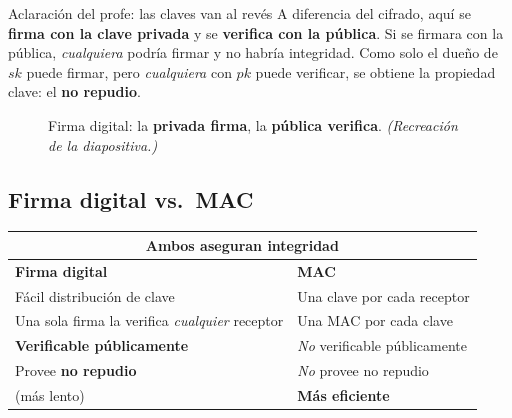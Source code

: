 \documentclass[11pt,a4paper]{article}
\newcommand{\Sign}{\mathrm{Sign}}
\newcommand{\Vrfy}{\mathrm{Vrfy}}
\begin{document}
\begin{defbox}{Aclaración del profe: las claves van al revés}
A diferencia del cifrado, aquí se \textbf{firma con la clave privada} y se \textbf{verifica con
la pública}. Si se firmara con la pública, \emph{cualquiera} podría firmar y no habría
integridad. Como solo el dueño de $sk$ puede firmar, pero \emph{cualquiera} con $pk$ puede
verificar, se obtiene la propiedad clave: el \textbf{no repudio}.
\end{defbox}

\begin{figure}[h]
\centering
{}
\caption{Firma digital: la \textbf{privada firma}, la \textbf{pública verifica}.
\textit{(Recreación de la diapositiva.)}}
\end{figure}

\subsection{Firma digital vs.\ MAC}
\begin{center}
\renewcommand{\arraystretch}{1.25}
\begin{tabular}{p{6.8cm} p{6.8cm}}
\toprule
\multicolumn{2}{c}{\textbf{Ambos aseguran integridad}}\\
\midrule
\textbf{Firma digital} & \textbf{MAC}\\
\midrule
Fácil distribución de clave & Una clave por cada receptor\\
Una sola firma la verifica \emph{cualquier} receptor & Una MAC por cada clave\\
\textbf{Verificable públicamente} & \emph{No} verificable públicamente\\
Provee \textbf{no repudio} & \emph{No} provee no repudio\\
(más lento) & \textbf{Más eficiente}\\
\bottomrule
\end{tabular}
\end{center}
\end{document}
